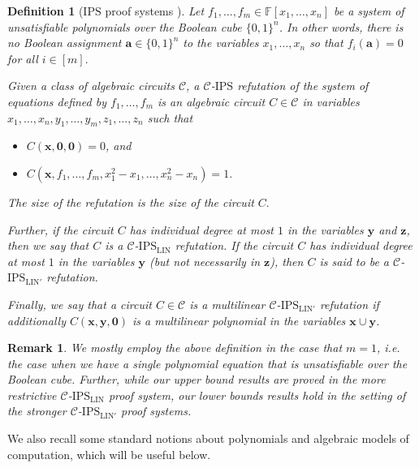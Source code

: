\documentclass[11pt]{article}
\newtheorem{definition}[theorem]{Definition}
\newtheorem{remark}[theorem]{Remark}
\newcommand{\Boo}{\{0,1 \}}
\newcommand{\F}{\mathbb{F}}
\newcommand{\IPS}{\mathrm{IPS}}
\newcommand{\IPSLIN}{\mathrm{IPS}_{\mathrm{LIN}}}
\newcommand{\IPSLINp}{\mathrm{IPS}_{\mathrm{LIN}'}}
\begin{document}
\begin{definition}[$\IPS$ proof systems \cite{GP14, FSTW21}]
\label{def:proof-systems}
Let $f_1,\ldots, f_m \in \F[x_1,\ldots, x_n]$ be a system of unsatisfiable polynomials over the Boolean cube $\Boo^{n}$. In other words, there is no Boolean assignment $\mathbf{a} \in \{0,1\}^n$ to the variables $x_1,\ldots, x_n$ so that $f_i(\mathbf{a}) = 0$ for all $i\in [m].$

Given a class of algebraic circuits $\mathcal{C}$, a \emph{$\mathcal{C}$-$\IPS$ refutation} of the system of equations defined by $f_1,\ldots,f_m$ is an algebraic circuit $C\in \mathcal{C}$ in variables $x_1,\ldots,x_n,y_1,\ldots, y_m, z_1,\ldots, z_n$ such that
\begin{itemize}
    \item $C(\mathbf{x},\mathbf{0},\mathbf{0}) = 0$, and
    \item $C(\mathbf{x},f_1,\ldots,f_m,x_1^2-x_1,\ldots,x_n^2-x_n) = 1.$
\end{itemize}
The size of the refutation is the size of the circuit $C.$

Further, if the circuit $C$ has individual degree at most $1$ in the variables $\mathbf{y}$ and $\mathbf{z}$, then we say that $C$ is a \emph{$\mathcal{C}$-$\IPSLIN$ refutation}. If the circuit $C$ has individual degree at most $1$ in the variables $\mathbf{y}$ (but not necessarily in $\mathbf{z}$), then $C$ is said to be a \emph{$\mathcal{C}$-$\IPSLINp$ refutation.}

Finally, we say that a circuit $C\in \mathcal{C}$ is a \emph{multilinear $\mathcal{C}$-$\IPSLINp$ refutation} if additionally $C(\mathbf{x},\mathbf{y},\mathbf{0})$ is a multilinear polynomial in the variables $\mathbf{x}\cup \mathbf{y}$.
\end{definition}


\begin{remark}
    \label{rem:def-pf-systems}
    We mostly employ the above definition in the case that $m=1$, i.e. the case when we have a single polynomial equation that is unsatisfiable over the Boolean cube. Further, while our upper bound results are proved in the more restrictive $\mathcal{C}$-$\IPSLIN$ proof system, our lower bounds results hold in the setting of the stronger $\mathcal{C}$-$\IPSLINp$ proof systems. 
\end{remark}

We also recall some standard notions about polynomials and algebraic models of computation, which will be useful below. 
\end{document}
